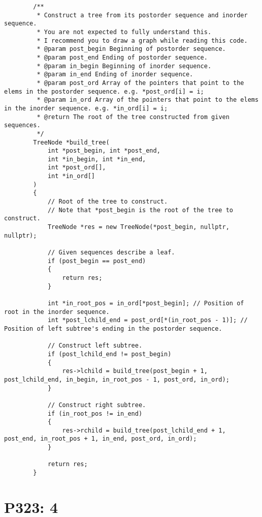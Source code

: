\documentclass[11pt]{ctexrep}
\begin{document}
    \begin{verbatim}
        /**
         * Construct a tree from its postorder sequence and inorder sequence.
         * You are not expected to fully understand this.
         * I recommend you to draw a graph while reading this code.
         * @param post_begin Beginning of postorder sequence.
         * @param post_end Ending of postorder sequence.
         * @param in_begin Beginning of inorder sequence.
         * @param in_end Ending of inorder sequence.
         * @param post_ord Array of the pointers that point to the elems in the postorder sequence. e.g. *post_ord[i] = i;
         * @param in_ord Array of the pointers that point to the elems in the inorder sequence. e.g. *in_ord[i] = i;
         * @return The root of the tree constructed from given sequences.
         */
        TreeNode *build_tree(
            int *post_begin, int *post_end,
            int *in_begin, int *in_end,
            int *post_ord[],
            int *in_ord[]
        )
        {
            // Root of the tree to construct.
            // Note that *post_begin is the root of the tree to construct.
            TreeNode *res = new TreeNode(*post_begin, nullptr, nullptr);

            // Given sequences describe a leaf.
            if (post_begin == post_end)
            {
                return res;
            }

            int *in_root_pos = in_ord[*post_begin]; // Position of root in the inorder sequence.
            int *post_lchild_end = post_ord[*(in_root_pos - 1)]; // Position of left subtree's ending in the postorder sequence.

            // Construct left subtree.
            if (post_lchild_end != post_begin)
            {
                res->lchild = build_tree(post_begin + 1, post_lchild_end, in_begin, in_root_pos - 1, post_ord, in_ord);
            }

            // Construct right subtree.
            if (in_root_pos != in_end)
            {
                res->rchild = build_tree(post_lchild_end + 1, post_end, in_root_pos + 1, in_end, post_ord, in_ord);
            }

            return res;
        }
    \end{verbatim}

    \chapter{P323: 4}
\end{document}
